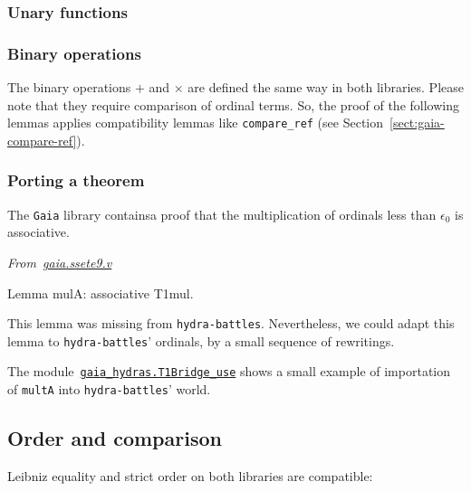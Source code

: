 
\subsubsection{Unary functions}


\subsubsection{Binary operations}
The binary operations $+$ and $\times$ are defined the same way in both libraries. Please note that they require comparison of ordinal terms. So, the proof of the following lemmas applies
compatibility lemmas like \texttt{compare\_ref} (see Section~\vref{sect:gaia-compare-ref}).


\subsubsection{Porting a theorem}
The \texttt{Gaia} library containsa proof that the multiplication of ordinals less than $\epsilon_0$ is associative.

\emph{From~\href{https://github.com/coq-community/gaia/blob/master/theories/ssete9.v}{gaia.ssete9.v}}

\begin{Coqsrc}
Lemma mulA: associative T1mul.
\end{Coqsrc}

This lemma was missing from \texttt{hydra-battles}. Nevertheless, we could adapt this lemma to \texttt{hydra-battles}' ordinals, by a small sequence of rewritings.


The module~\href{../theories/html/gaia_hydras.T1Bridge_use.html}%
{\texttt{gaia\_hydras.T1Bridge\_use}} shows a small
example of importation of \texttt{multA} into \texttt{hydra-battles}' world.


\subsection{Order and comparison}
Leibniz equality and strict order on both libraries are
compatible:

\label{sect:gaia-compare-ref}


